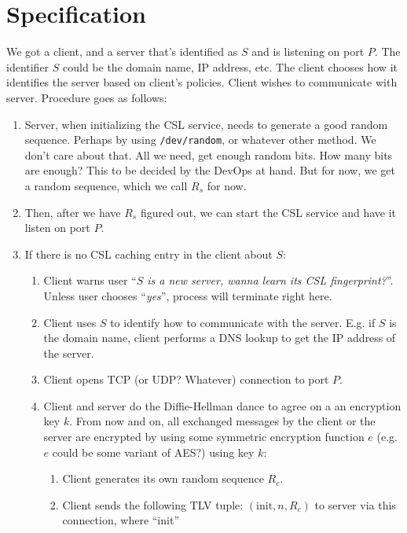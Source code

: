 \documentclass{article}
\begin{document}
\section{Specification}
We got a client, and a server that's identified as $S$  and is listening on
port $P$. The identifier $S$ could be the domain name, IP address, etc. The
client chooses how it identifies the server based on client's policies. Client
wishes to communicate with server. Procedure goes as follows:
\begin{enumerate}
    \item Server, when initializing the CSL service, needs to generate a good
    random sequence. Perhaps by using \texttt{/dev/random}, or whatever other
    method. We don't care about that. All we need, get enough random bits. How
    many bits are enough? This to be decided by the DevOps at hand. But for
    now, we get a random sequence, which we call $R_s$ for now.
    \item Then, after we have $R_s$ figured out, we can start the CSL service
    and have it listen on port $P$.
    \item If there is no CSL caching entry in the client about $S$:
        \begin{enumerate}
            \item Client warns user ``\emph{$S$ is a new server, wanna learn
            its CSL fingerprint?}''. Unless user chooses ``\emph{yes}'',
            process will terminate right here.
            \item Client uses $S$ to identify how to communicate with the
            server. E.g.  if $S$ is the domain name, client performs a DNS
            lookup to get the IP address of the server.
            \item Client opens TCP (or UDP? Whatever) connection to port $P$.
            \item Client and server do the Diffie-Hellman dance to agree on a
            an encryption key $k$. From now and on, all exchanged messages by
            the client or the server are encrypted by using some symmetric
            encryption function $e$ (e.g. $e$ could be some variant of AES?)
            using key $k$:
                \begin{enumerate}
                    \item Client generates its own random sequence $R_c$.
                    \item Client sends the following TLV tuple: $(\text{init},
                    n, R_c)$ to server via this connection, where ``init''

\end{enumerate}
\end{enumerate}
\end{enumerate}
\end{document}
